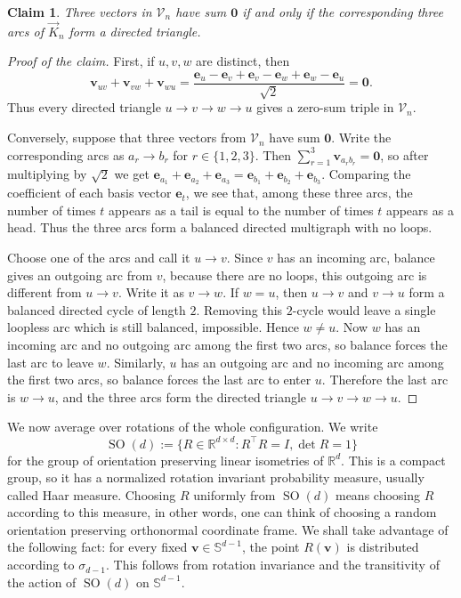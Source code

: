 \documentclass[11pt]{article}
\newtheorem{claim}[theorem]{Claim}
\newcommand{\SO}{\operatorname{SO}}
\theoremstyle{definition}
\newenvironment{poc}{\begin{proof}[Proof of the claim]\renewcommand*{\qedsymbol}{$\blacksquare$}}{\end{proof}}
\begin{document}
\begin{claim}\label{claim:zero-sum-directed-triangle}
Three vectors in \(\mathcal{V}_n\) have sum \(\boldsymbol{0}\)
if and only if the corresponding three arcs of \(\vec K_{n}\) form a
directed triangle.
\end{claim}
\begin{poc}
First, if \(u,v,w\) are distinct, then
\[
    \boldsymbol{v}_{uv}+\boldsymbol{v}_{vw}+\boldsymbol{v}_{wu}
    =
    \frac{\boldsymbol{e}_{u}-\boldsymbol{e}_{v}
    +\boldsymbol{e}_{v}-\boldsymbol{e}_{w}
    +\boldsymbol{e}_{w}-\boldsymbol{e}_{u}}{\sqrt2}
    =
    \boldsymbol{0}.
\]
Thus every directed triangle \(u\to v\to w\to u\) gives a zero-sum
triple in \(\mathcal{V}_n\).

Conversely, suppose that three vectors from \(\mathcal{V}_n\) have sum
\(\boldsymbol{0}\).  Write the corresponding arcs as \(a_{r}\to b_{r}\) for \(r\in\{1,2,3\}\).  Then
\(\sum_{r=1}^{3}\boldsymbol{v}_{a_{r}b_{r}}=\boldsymbol{0}\), so after
multiplying by \(\sqrt2\) we get
\(
\boldsymbol{e}_{a_{1}}+\boldsymbol{e}_{a_{2}}+\boldsymbol{e}_{a_{3}} =\boldsymbol{e}_{b_{1}}+\boldsymbol{e}_{b_{2}}+\boldsymbol{e}_{b_{3}}.
\)
Comparing the coefficient of each basis vector \(\boldsymbol{e}_{t}\), we
see that, among these three arcs, the number of times \(t\) appears as a
tail is equal to the number of times \(t\) appears as a head.  Thus the
three arcs form a balanced directed multigraph with no loops.

Choose one of the arcs and call it \(u\to v\).  Since \(v\) has an
incoming arc, balance gives an outgoing arc from \(v\), because there are
no loops, this outgoing arc is different from \(u\to v\).  Write it as
\(v\to w\).  If \(w=u\), then \(u\to v\) and \(v\to u\) form a balanced
directed cycle of length \(2\). Removing this \(2\)-cycle would leave a single
loopless arc which is still balanced, impossible.  Hence \(w\ne u\).
Now \(w\) has an incoming arc and no outgoing arc among the first two
arcs, so balance forces the last arc to leave \(w\). Similarly, \(u\)
has an outgoing arc and no incoming arc among the first two arcs, so
balance forces the last arc to enter \(u\).  Therefore the last arc is
\(w\to u\), and the three arcs form the directed triangle
\(u\to v\to w\to u\).
\end{poc}

We now average over rotations of the whole configuration. We write
\[
    \SO(d):=\{R\in\mathbb R^{d\times d}:R^{\top}R=I,\det{R}=1\}
\]
for the group of orientation preserving linear isometries of
\(\mathbb R^{d}\). This is a compact group, so it has a normalized
rotation invariant probability measure, usually called Haar measure. Choosing
\(R\) uniformly from \(\SO(d)\) means choosing \(R\) according to this
measure, in other words, one can think of choosing a random
orientation preserving orthonormal coordinate frame. We shall take advantage of the following fact: for every fixed \(\boldsymbol{v}\in\mathbb S^{d-1}\), the point
\(R(\boldsymbol{v})\) is distributed according to \(\sigma_{d-1}\). This
follows from rotation invariance and the transitivity of the action of
\(\SO(d)\) on \(\mathbb S^{d-1}\).
\end{document}
